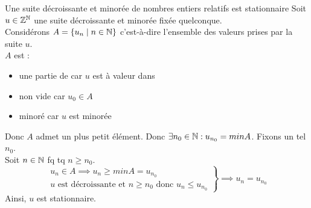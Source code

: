\documentclass{article}
\begin{document}
\begin{question_kholle}{Une suite décroissante et minorée de nombres entiers relatifs est stationnaire}
	Soit $u \in \mathbb Z^{\mathbb N}$ une suite décroissante et minorée fixée quelconque. \\
	Considérons $A = \{ u_n \;|\; n \in \mathbb N \}$ c'est-à-dire l'ensemble des valeurs prises par la suite $u$. \\
	$A$ est : \begin{itemize}[label=\textemdash]
		\item une partie de \Z car $u$ est à valeur dans \Z
		\item non vide car $u_0 \in A$
		\item minoré car $u$ est minorée
	\end{itemize}
	Donc $A$ admet un plus petit élément. Donc $\exists n_0 \in \mathbb N: u_{n_0} = min A$. Fixons un tel $n_0$. \\
	Soit $n \in \mathbb N$ fq tq $n \geqslant n_0$.
	\begin{equation*}
		\left. \begin{matrix}
			u_n \in A \implies u_n \geqslant min A = u_{n_0} \\
			u \text{ est décroissante et } n \geqslant n_0 \text{ donc } u_n \leqslant u_{n_0}
		\end{matrix}
		\right\} \implies u_n = u_{n_0}
	\end{equation*}
	Ainsi, $u$ est stationnaire.
\end{question_kholle}
\end{document}
